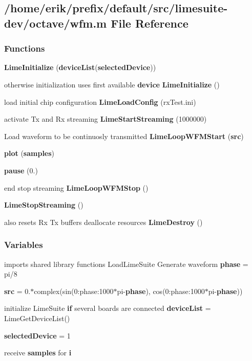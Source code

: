 \subsection{/home/erik/prefix/default/src/limesuite-\/dev/octave/wfm.m File Reference}
\label{wfm_8m}
\subsubsection*{Functions}
\begin{DoxyCompactItemize}
\item 
{\bf Lime\+Initialize} ({\bf device\+List}({\bf selected\+Device}))
\item 
otherwise initialization uses first available {\bf device} {\bf Lime\+Initialize} ()
\item 
load initial chip configuration {\bf Lime\+Load\+Config} (\textquotesingle{}rx\+Test.\+ini\textquotesingle{})
\item 
activate Tx and Rx streaming {\bf Lime\+Start\+Streaming} (1000000)
\item 
Load waveform to be continuosly transmitted {\bf Lime\+Loop\+W\+F\+M\+Start} ({\bf src})
\item 
{\bf plot} ({\bf samples})
\item 
{\bf pause} (0.)
\item 
end stop streaming {\bf Lime\+Loop\+W\+F\+M\+Stop} ()
\item 
{\bf Lime\+Stop\+Streaming} ()
\item 
also resets Rx Tx buffers deallocate resources {\bf Lime\+Destroy} ()
\end{DoxyCompactItemize}
\subsubsection*{Variables}
\begin{DoxyCompactItemize}
\item 
imports shared library functions Load\+Lime\+Suite Generate waveform {\bf phase} = pi/8
\item 
{\bf src} = 0.$\ast$complex(sin(0\+:phase\+:1000$\ast$pi-\/{\bf phase}), cos(0\+:phase\+:1000$\ast$pi-\/{\bf phase}))
\item 
initialize Lime\+Suite {\bf if} several boards are connected {\bf device\+List} = Lime\+Get\+Device\+List()
\item 
{\bf selected\+Device} = 1
\item 
receive {\bf samples} for {\bf i}
\end{DoxyCompactItemize}


